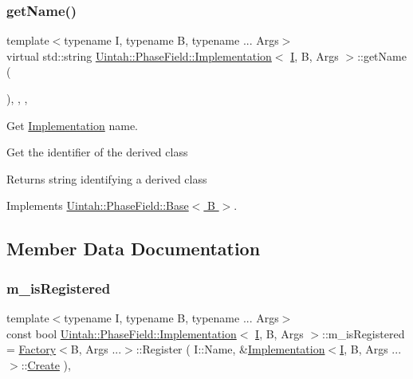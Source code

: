 \subsubsection{\texorpdfstring{get\+Name()}{getName()}}
{\footnotesize\ttfamily template$<$typename I, typename B, typename ... Args$>$ \\
virtual std\+::string \hyperlink{classUintah_1_1PhaseField_1_1Implementation}{Uintah\+::\+Phase\+Field\+::\+Implementation}$<$ \hyperlink{structUintah_1_1PhaseField_1_1I}{I}, B, Args $>$\+::get\+Name (\begin{DoxyParamCaption}{ }\end{DoxyParamCaption})\hspace{0.3cm}{\ttfamily [inline]}, {\ttfamily [override]}, {\ttfamily [protected]}, {\ttfamily [virtual]}}



Get \hyperlink{classUintah_1_1PhaseField_1_1Implementation}{Implementation} name. 

Get the identifier of the derived class

\begin{DoxyReturn}{Returns}
string identifying a derived class 
\end{DoxyReturn}


Implements \hyperlink{classUintah_1_1PhaseField_1_1Base_acd19fa2507f239588926b04069ad1b73}{Uintah\+::\+Phase\+Field\+::\+Base$<$ B $>$}.



\subsection{Member Data Documentation}
\mbox{\label{classUintah_1_1PhaseField_1_1Implementation_a8415e7c1b2e8aeebec083cf199f5a9c1}} 
\subsubsection{\texorpdfstring{m\+\_\+is\+Registered}{m\_isRegistered}}
{\footnotesize\ttfamily template$<$typename I, typename B, typename ... Args$>$ \\
const bool \hyperlink{classUintah_1_1PhaseField_1_1Implementation}{Uintah\+::\+Phase\+Field\+::\+Implementation}$<$ \hyperlink{structUintah_1_1PhaseField_1_1I}{I}, B, Args $>$\+::m\+\_\+is\+Registered = \hyperlink{classUintah_1_1PhaseField_1_1Factory}{Factory}$<$B, Args ...$>$\+::Register ( I\+::\+Name, \&\hyperlink{classUintah_1_1PhaseField_1_1Implementation}{Implementation}$<$\hyperlink{structUintah_1_1PhaseField_1_1I}{I}, B, Args ... $>$\+::\hyperlink{classUintah_1_1PhaseField_1_1Implementation_a411e1f5a60175c99fee000c0486e956c}{Create} )\hspace{0.3cm}{\ttfamily [static]}, {\ttfamily [protected]}}



